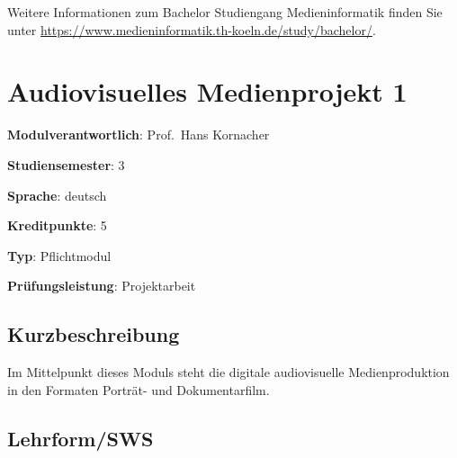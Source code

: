Weitere Informationen zum Bachelor Studiengang Medieninformatik finden
Sie unter
\url{https://www.medieninformatik.th-koeln.de/study/bachelor/}.

\hypertarget{audiovisuelles-medienprojekt-1pathlabelmi-2017modulbeschreibungen-bachelorba_avm}{%
\chapter{Audiovisuelles Medienprojekt
1\label{/mi-2017/modulbeschreibungen-bachelor/BA_AVM}}\label{audiovisuelles-medienprojekt-1pathlabelmi-2017modulbeschreibungen-bachelorba_avm}}

\begin{modulHead}
\textbf{Modulverantwortlich}: Prof.~Hans
Kornacher
\end{modulHead}
\begin{modulHead}
\textbf{Studiensemester}:
3
\end{modulHead}
\begin{modulHead}
\textbf{Sprache}:
deutsch
\end{modulHead}
\begin{modulHead}
\textbf{Kreditpunkte}:
5
\end{modulHead}
\begin{modulHead}
\textbf{Typ}:
Pflichtmodul
\end{modulHead}
\begin{modulHead}
\textbf{Prüfungsleistung}:
Projektarbeit
\end{modulHead}


\hypertarget{kurzbeschreibungpathlabelmi-2017modulbeschreibungen-bachelorba_avm}{%
\section*{Kurzbeschreibung\label{/mi-2017/modulbeschreibungen-bachelor/BA_AVM}}\label{kurzbeschreibungpathlabelmi-2017modulbeschreibungen-bachelorba_avm}}

Im Mittelpunkt dieses Moduls steht die digitale audiovisuelle
Medienproduktion in den Formaten Porträt- und Dokumentarfilm.

\hypertarget{lehrformswspathlabelmi-2017modulbeschreibungen-bachelorba_avm}{%
\section*{Lehrform/SWS\label{/mi-2017/modulbeschreibungen-bachelor/BA_AVM}}\label{lehrformswspathlabelmi-2017modulbeschreibungen-bachelorba_avm}}

